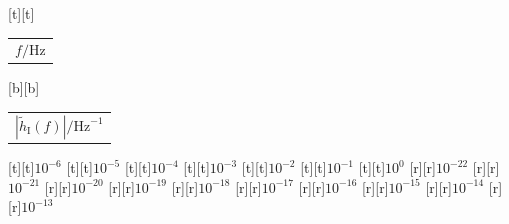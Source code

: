 %    
%
%
\begin{psfrags}%
\psfragscanon%
%
[t][t]{\color[rgb]{0,0,0}\setlength{\tabcolsep}{0pt}\begin{tabular}{c}{\Large$f/\mathrm{Hz}$}\end{tabular}}%
[b][b]{\color[rgb]{0,0,0}\setlength{\tabcolsep}{0pt}\begin{tabular}{c}{\Large$\left|\widetilde{h}_\mathrm{I}(f)\right|/\mathrm{Hz}^{-1}$}\vspace{1.5mm}\end{tabular}}%
%
[t][t]{$10^{-6}$}%
[t][t]{$10^{-5}$}%
[t][t]{$10^{-4}$}%
[t][t]{$10^{-3}$}%
[t][t]{$10^{-2}$}%
[t][t]{$10^{-1}$}%
[t][t]{$10^{0}$}%
%
[r][r]{$10^{-22}$}%
[r][r]{$10^{-21}$}%
[r][r]{$10^{-20}$}%
[r][r]{$10^{-19}$}%
[r][r]{$10^{-18}$}%
[r][r]{$10^{-17}$}%
[r][r]{$10^{-16}$}%
[r][r]{$10^{-15}$}%
[r][r]{$10^{-14}$}%
[r][r]{$10^{-13}$}%
%
%
\end{psfrags}%
%
